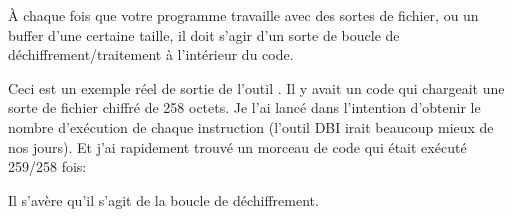 
À chaque fois que votre programme travaille avec des sortes de fichier, ou un buffer
d'une certaine taille, il doit s'agir d'un sorte de boucle de déchiffrement/traitement
à l'intérieur du code.

Ceci est un exemple réel de sortie de l'outil \tracer.
Il y avait un code qui chargeait une sorte de fichier chiffré de 258 octets.
Je l'ai lancé dans l'intention d'obtenir le nombre d'exécution de chaque instruction
(l'outil \ac{DBI} irait beaucoup mieux de nos jours).
Et j'ai rapidement trouvé un morceau de code qui était exécuté 259/258 fois:



Il s'avère qu'il s'agit de la boucle de déchiffrement.

